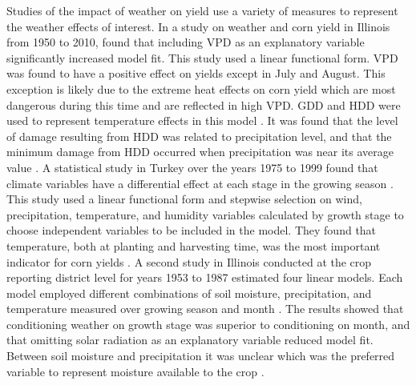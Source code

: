 Studies of the impact of weather on yield use a variety of measures to represent the weather effects of interest.  In a study on weather and corn yield in Illinois from 1950 to 2010, \cite{roberts2012agronomic} found that  including VPD as an explanatory variable significantly increased model fit. This study used a linear functional form. VPD was found to have a positive effect on yields except in July and August. This exception is likely due to the extreme heat effects on corn yield which are most dangerous during this time and are reflected in high VPD. GDD and HDD were used to represent temperature effects in this model \citep{roberts2012agronomic}. It was found that the level of damage resulting from HDD was related to precipitation level, and that the minimum damage from HDD occurred when precipitation was near its average value  \citep{roberts2012agronomic}.  A statistical study in Turkey over the years 1975 to 1999 found that climate variables have a differential effect at each stage in the growing season \citep{ozkan2002impacts}. This study used a linear functional form and stepwise selection on wind, precipitation, temperature, and humidity variables calculated by growth stage to choose independent variables to be included in the model. They found that temperature, both at planting and harvesting time, was the most important indicator for corn yields \citep{ozkan2002impacts}. A second study in Illinois conducted at the crop reporting district level for years 1953 to 1987 estimated four linear models. Each model employed different combinations of soil moisture, precipitation, and temperature measured over growing season and month \citep{dixon1994estimating}. The results showed that conditioning weather on growth stage was superior to conditioning on month, and that omitting solar radiation as an explanatory variable reduced model fit. Between soil moisture and precipitation it was unclear which was the preferred variable to represent moisture available to the crop \citep{dixon1994estimating}.


